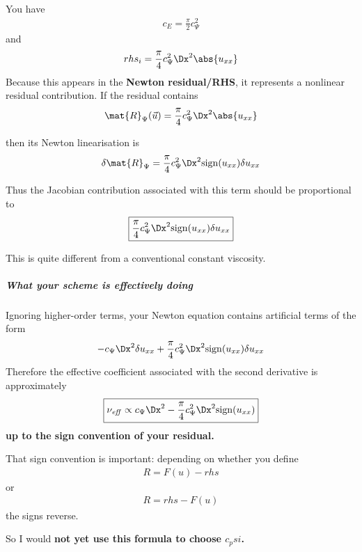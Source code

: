 \documentclass{mooiman_memo}
\begin{document}
You have
\begin{align}
    c_E = \frac{\pi}{2}c_\Psi^2
\end{align}
and
\begin{align}
    rhs_i = \frac{\pi}{4} c_\Psi^2 \Dx^2 \abs{u_{xx}}
\end{align}
%
Because this appears in the \textbf{Newton residual/RHS}, it represents a nonlinear residual contribution.
%
If the residual contains
\begin{align}
    \mat{R}_\Psi(\vec{u}) = \frac{\pi}{4} c_\Psi^2 \Dx^2 \abs{u_{xx}}
\end{align}

then its Newton linearisation is
\begin{align}
    \delta \mat{R}_\Psi = \frac{\pi}{4} c_\Psi^2 \Dx^2 {\rm sign}(u_{xx})\delta u_{xx}
\end{align}


Thus the Jacobian contribution associated with this term should be proportional to
\begin{align}
    \boxed{
    \frac{\pi}{4} c_\Psi^2 \Dx^2 {\rm sign}(u_{xx})\delta u_{xx}
    }
\end{align}

%
This is quite different from a conventional constant viscosity.

\subparagraph*{What your scheme is effectively doing}

Ignoring higher-order terms, your Newton equation contains artificial terms of the form
\begin{align}
    -c_{\Psi} \Dx^2 \delta u_{xx}
    + \frac{\pi}{4} c_\Psi^2 \Dx^2 {\rm sign}(u_{xx})\delta u_{xx}
\end{align}
%
Therefore the effective coefficient associated with the second derivative is approximately
\begin{align}
    \boxed{
    \nu_{\it eff} \propto    c_{\Psi} \Dx^2
    - \frac{\pi}{4} c_\Psi^2 \Dx^2 {\rm sign}(u_{xx})
    }
\end{align}
%
\textbf{up to the sign convention of your residual.}

That sign convention is important: depending on whether you define
\begin{align}
    R = F(u) - rhs
\end{align}
or
\begin{align}
    R = rhs - F(u)
\end{align}
the signs reverse.

So I would \textbf{not yet use this formula to choose $c_psi$.}
\end{document}
